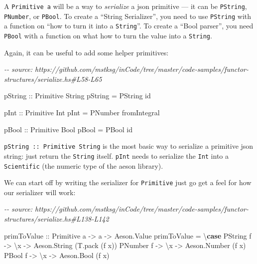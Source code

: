 \documentclass[]{article}
\newenvironment{Shaded}{}{}
\newcommand{\CommentTok}[1]{\textcolor[rgb]{0.38,0.63,0.69}{\textit{#1}}}
\newcommand{\DataTypeTok}[1]{\textcolor[rgb]{0.56,0.13,0.00}{#1}}
\newcommand{\FunctionTok}[1]{\textcolor[rgb]{0.02,0.16,0.49}{#1}}
\newcommand{\KeywordTok}[1]{\textcolor[rgb]{0.00,0.44,0.13}{\textbf{#1}}}
\newcommand{\NormalTok}[1]{#1}
\newcommand{\OtherTok}[1]{\textcolor[rgb]{0.00,0.44,0.13}{#1}}
\begin{document}
A \texttt{Primitive\ a} will be a way to \emph{serialize} a json primitive ---
it can be \texttt{PString}, \texttt{PNumber}, or \texttt{PBool}. To create a
``String Serializer'', you need to use \texttt{PString} with a function on ``how
to turn it into a \texttt{String}''. To create a ``Bool parser'', you need
\texttt{PBool} with a function on what how to turn the value into a
\texttt{String}.

Again, it can be useful to add some helper primitives:

\begin{Shaded}
\begin{Highlighting}[]
\CommentTok{{-}{-} source: https://github.com/mstksg/inCode/tree/master/code{-}samples/functor{-}structures/serialize.hs\#L58{-}L65}

\OtherTok{pString ::} \DataTypeTok{Primitive} \DataTypeTok{String}
\NormalTok{pString }\OtherTok{=} \DataTypeTok{PString} \FunctionTok{id}

\OtherTok{pInt ::} \DataTypeTok{Primitive} \DataTypeTok{Int}
\NormalTok{pInt }\OtherTok{=} \DataTypeTok{PNumber} \FunctionTok{fromIntegral}

\OtherTok{pBool ::} \DataTypeTok{Primitive} \DataTypeTok{Bool}
\NormalTok{pBool }\OtherTok{=} \DataTypeTok{PBool} \FunctionTok{id}
\end{Highlighting}
\end{Shaded}

\texttt{pString\ ::\ Primitive\ String} is the most basic way to serialize a
primitive json string: just return the \texttt{String} itself. \texttt{pInt}
needs to serialize the \texttt{Int} into a \texttt{Scientific} (the numeric type
of the aeson library).

We can start off by writing the serializer for \texttt{Primitive} just go get a
feel for how our serializer will work:

\begin{Shaded}
\begin{Highlighting}[]
\CommentTok{{-}{-} source: https://github.com/mstksg/inCode/tree/master/code{-}samples/functor{-}structures/serialize.hs\#L138{-}L142}

\OtherTok{primToValue ::} \DataTypeTok{Primitive}\NormalTok{ a }\OtherTok{{-}\textgreater{}}\NormalTok{ a }\OtherTok{{-}\textgreater{}} \DataTypeTok{Aeson.Value}
\NormalTok{primToValue }\OtherTok{=}\NormalTok{ \textbackslash{}}\KeywordTok{case}
  \DataTypeTok{PString}\NormalTok{ f }\OtherTok{{-}\textgreater{}}\NormalTok{ \textbackslash{}x }\OtherTok{{-}\textgreater{}} \DataTypeTok{Aeson.String}\NormalTok{ (T.pack (f x))}
  \DataTypeTok{PNumber}\NormalTok{ f }\OtherTok{{-}\textgreater{}}\NormalTok{ \textbackslash{}x }\OtherTok{{-}\textgreater{}} \DataTypeTok{Aeson.Number}\NormalTok{ (f x)}
  \DataTypeTok{PBool}\NormalTok{   f }\OtherTok{{-}\textgreater{}}\NormalTok{ \textbackslash{}x }\OtherTok{{-}\textgreater{}} \DataTypeTok{Aeson.Bool}\NormalTok{   (f x)}
\end{Highlighting}
\end{Shaded}
\end{document}
